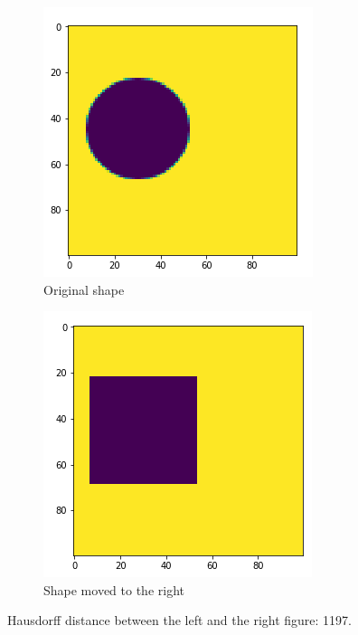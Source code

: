 \begin{figure}[H]
    \centering
    \begin{subfigure}{.35\textwidth}
        \centering
        \includegraphics[width=\linewidth]{chapters/06_hdm/images/hdm_original.png}
        \caption{Original shape}
    \end{subfigure}%
    \begin{subfigure}{.35\textwidth}
        \centering
        \includegraphics[width=\linewidth]{chapters/06_hdm/images/hdm_square.png}
        \caption{Shape moved to the right}
    \end{subfigure}
    \caption{Hausdorff distance between the left and the right figure: 1197. }
    \label{hdm_square}
\end{figure}

